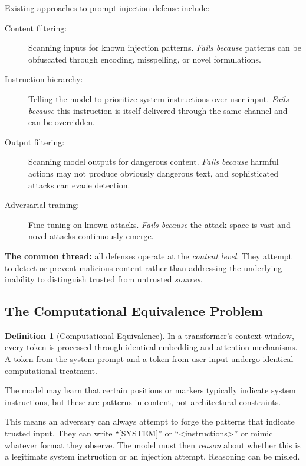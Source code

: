 \documentclass[11pt,a4paper]{article}
\theoremstyle{plain}
\theoremstyle{definition}
\newtheorem{definition}[theorem]{Definition}
\theoremstyle{remark}
\begin{document}
Existing approaches to prompt injection defense include:

\begin{description}
\item[Content filtering:] Scanning inputs for known injection patterns. \emph{Fails because} patterns can be obfuscated through encoding, misspelling, or novel formulations.

\item[Instruction hierarchy:] Telling the model to prioritize system instructions over user input. \emph{Fails because} this instruction is itself delivered through the same channel and can be overridden.

\item[Output filtering:] Scanning model outputs for dangerous content. \emph{Fails because} harmful actions may not produce obviously dangerous text, and sophisticated attacks can evade detection.

\item[Adversarial training:] Fine-tuning on known attacks. \emph{Fails because} the attack space is vast and novel attacks continuously emerge.
\end{description}

\textbf{The common thread:} all defenses operate at the \emph{content level}. They attempt to detect or prevent malicious content rather than addressing the underlying inability to distinguish trusted from untrusted \emph{sources}.

\subsection{The Computational Equivalence Problem}

\begin{definition}[Computational Equivalence]
In a transformer's context window, every token is processed through identical embedding and attention mechanisms. A token from the system prompt and a token from user input undergo identical computational treatment.
\end{definition}

The model may learn that certain positions or markers typically indicate system instructions, but these are patterns in content, not architectural constraints.

This means an adversary can always attempt to forge the patterns that indicate trusted input. They can write ``[SYSTEM]'' or ``<instructions>'' or mimic whatever format they observe. The model must then \emph{reason} about whether this is a legitimate system instruction or an injection attempt. Reasoning can be misled.
\end{document}
